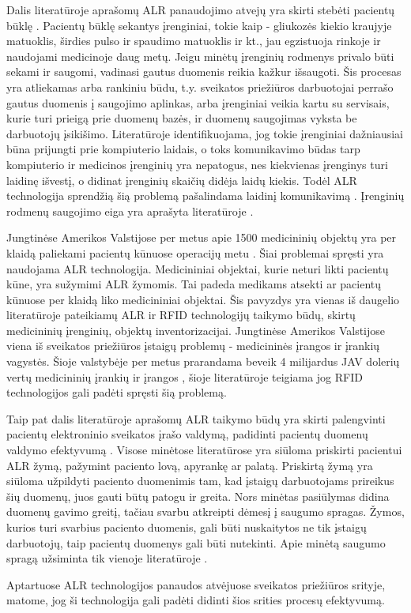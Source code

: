 Dalis literatūroje aprašomų ALR panaudojimo atvejų yra skirti stebėti pacientų būklę \cite{Strommer2006} \cite{Gautam} \cite{Zhang2011}. Pacientų būklę sekantys įrenginiai, tokie kaip - gliukozės kiekio kraujyje matuoklis, širdies pulso ir spaudimo matuoklis ir kt., jau egzistuoja rinkoje ir naudojami medicinoje daug metų. Jeigu minėtų įrenginių rodmenys privalo būti sekami ir saugomi, vadinasi gautus duomenis reikia kažkur išsaugoti. Šis procesas yra atliekamas arba rankiniu būdu, t.y. sveikatos priežiūros darbuotojai perrašo gautus duomenis į saugojimo aplinkas, arba įrenginiai veikia kartu su servisais, kurie turi prieigą prie duomenų bazės, ir duomenų saugojimas vyksta be darbuotojų įsikišimo. Literatūroje \cite{Strommer2006} identifikuojama, jog tokie įrenginiai dažniausiai būna prijungti prie kompiuterio laidais, o toks komunikavimo būdas tarp kompiuterio ir medicinos įrenginių yra nepatogus, nes kiekvienas įrenginys turi laidinę išvestį, o didinat įrenginių skaičių didėja laidų kiekis. Todėl ALR technologija sprendžią šią problemą pašalindama laidinį komunikavimą \cite{Strommer2006}. Įrenginių rodmenų saugojimo eiga yra aprašyta literatūroje \cite{Zhang2011}.

Jungtinėse Amerikos Valstijose per metus apie 1500 medicininių objektų yra per klaidą paliekami pacientų kūnuose operacijų metu \cite{RamaKrishnaPrasad}. Šiai problemai spręsti yra naudojama ALR technologija. Medicininiai objektai, kurie neturi likti pacientų kūne, yra sužymimi ALR žymomis. Tai padeda medikams atsekti ar pacientų kūnuose per klaidą liko medicininiai objektai. Šis pavyzdys yra vienas iš daugelio literatūroje \cite{Ajami2014} \cite{Puma2012} \cite{Azlina2013} pateikiamų ALR ir RFID technologijų taikymo būdų, skirtų medicininių įrenginių, objektų inventorizacijai. Jungtinėse Amerikos Valstijose viena iš sveikatos priežiūros įstaigų problemų - medicininės įrangos ir įrankių vagystės. Šioje valstybėje per metus prarandama beveik 4 milijardus JAV dolerių vertų medicininių įrankių ir įrangos \cite{RamaKrishnaPrasad}, šioje literatūroje teigiama jog RFID technologijos gali padėti spręsti šią problemą.

Taip pat dalis literatūroje aprašomų ALR taikymo būdų yra skirti palengvinti pacientų elektroninio sveikatos įrašo valdymą, padidinti pacientų duomenų valdymo efektyvumą \cite{Gautam} \cite{RamaKrishnaPrasad} \cite{Fontecha2011} \cite{Davcev2015}. Visose minėtose literatūrose yra siūloma priskirti pacientui ALR žymą, pažymint paciento lovą, apyrankę ar palatą. Priskirtą žymą yra siūloma užpildyti paciento duomenimis tam, kad įstaigų darbuotojams prireikus šių duomenų, juos gauti būtų patogu ir greita. Nors minėtas pasiūlymas didina duomenų gavimo greitį, tačiau svarbu atkreipti dėmesį į saugumo spragas. Žymos, kurios turi svarbius paciento duomenis, gali būti nuskaitytos ne tik įstaigų darbuotojų, taip pacientų duomenys gali būti nutekinti. Apie minėtą saugumo spragą užsiminta tik vienoje literatūroje \cite{RamaKrishnaPrasad}.

Aptartuose ALR technologijos panaudos atvėjuose sveikatos priežiūros srityje, matome, jog ši technologija gali padėti didinti šios srities procesų efektyvumą.
